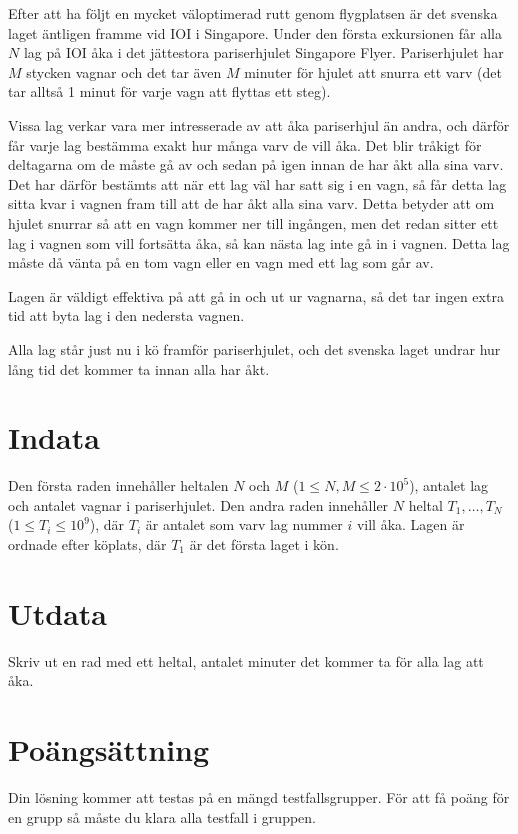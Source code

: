 %
%
Efter att ha följt en mycket väloptimerad rutt genom flygplatsen är det svenska laget äntligen framme vid IOI i Singapore.
Under den första exkursionen får alla $N$ lag på IOI åka i det jättestora pariserhjulet Singapore Flyer.
Pariserhjulet har $M$ stycken vagnar och det tar även $M$ minuter för hjulet att snurra ett varv
(det tar alltså 1 minut för varje vagn att flyttas ett steg).

Vissa lag verkar vara mer intresserade av att åka pariserhjul än andra, och därför får varje lag bestämma exakt hur många varv de vill åka.
Det blir tråkigt för deltagarna om de måste gå av och sedan på igen innan de har åkt alla sina varv.
Det har därför bestämts att när ett lag väl har satt sig i en vagn, så får detta lag sitta kvar i vagnen fram till att de har åkt alla sina varv.
Detta betyder att om hjulet snurrar så att en vagn kommer ner till ingången, men det redan sitter ett lag i vagnen som vill fortsätta åka,
så kan nästa lag inte gå in i vagnen. Detta lag måste då vänta på en tom vagn eller en vagn med ett lag som går av.

Lagen är väldigt effektiva på att gå in och ut ur vagnarna, så det tar ingen extra tid att byta lag i den nedersta vagnen.

Alla lag står just nu i kö framför pariserhjulet, och det svenska laget undrar hur lång tid det kommer ta innan alla har åkt.

\section*{Indata}
Den första raden innehåller heltalen $N$ och $M$ ($1 \leq N,M \leq 2 \cdot 10^5$),
antalet lag och antalet vagnar i pariserhjulet.
Den andra raden innehåller $N$ heltal $T_1, \dots , T_N$ ($1 \leq T_i \leq 10^9$), där $T_i$ är antalet som varv lag
nummer $i$ vill åka. Lagen är ordnade efter köplats, där $T_1$ är det första laget i kön.

\section*{Utdata}
Skriv ut en rad med ett heltal, antalet minuter det kommer ta för alla lag att åka.

\section*{Poängsättning}
Din lösning kommer att testas på en mängd testfallsgrupper.
För att få poäng för en grupp så måste du klara alla testfall i gruppen.

